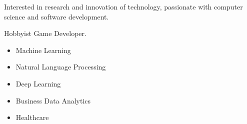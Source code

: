 







Interested in research and innovation of technology, passionate with computer science and software development.

Hobbyist Game Developer. 

 




\normalsize
{}



\begin{itemize}
\item\linespread{1.4} \large{ Machine Learning}
\item  Natural Language Processing
\item Deep Learning
\item Business Data Analytics
\item Healthcare

\end{itemize}
 









